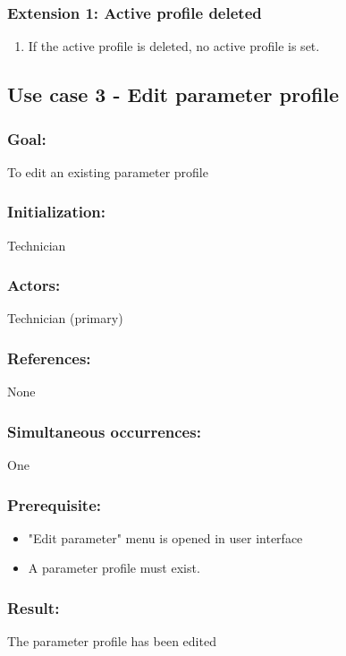 \begin{framed}
	\subsubsection*{Extension 1: Active profile deleted}
		\begin{enumerate}
			\item If the active profile is deleted, no active profile is set.
		\end{enumerate}
\end{framed}



\begin{framed}
\subsection{Use case 3 - Edit parameter profile}
\subsubsection*{Goal:}
To edit an existing parameter profile 

\subsubsection*{Initialization:}
Technician

\subsubsection*{Actors:}
Technician (primary)

\subsubsection*{References:}
None

\subsubsection*{Simultaneous occurrences:}
One

\subsubsection*{Prerequisite:}
\begin{itemize}
	\item "Edit parameter" menu is opened in user interface
	\item A parameter profile must exist.
\end{itemize}


\subsubsection*{Result:}
The parameter profile has been edited


\end{framed}
